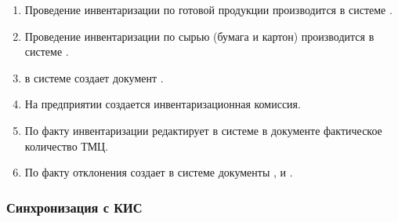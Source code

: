 \begin{enumerate}
\item Проведение инвентаризации по готовой продукции производится в системе \gofro. 
\item Проведение инвентаризации по сырью (бумага и картон) производится в системе \gofro. \item	\kladovshik в системе \gofro создает документ .
\item	На предприятии создается инвентаризационная комиссия.
\item	По факту инвентаризации \kladovshik редактирует в системе \gofro в документе  фактическое количество ТМЦ.
\item	По факту отклонения \kladovshik создает в системе документы ,  и .

\end{enumerate}


\subsubsection{Синхронизация с КИС}
\label{bp:storege_integration}

